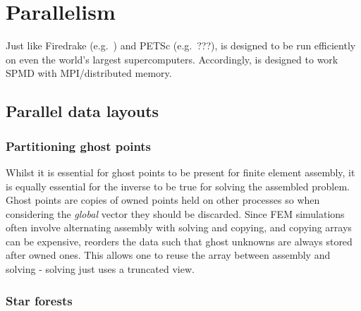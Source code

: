 \documentclass[thesis]{subfiles}
\begin{document}
\chapter{Parallelism}
\label{chapter:parallel}

Just like Firedrake (e.g.~\cite{betteridgeCodeGenerationProductive2021}) and PETSc (e.g.~???),  is designed to be run efficiently on even the world's largest supercomputers.
Accordingly,  is designed to work SPMD with MPI/distributed memory.

\section{Parallel data layouts}


\subsection{Partitioning ghost points}

Whilst it is essential for ghost points to be present for finite element assembly, it is equally essential for the inverse to be true for solving the assembled problem.
Ghost points are copies of owned points held on other processes so when considering the \textit{global} vector they should be discarded.
Since FEM simulations often involve alternating assembly with solving and copying, and copying arrays can be expensive,  reorders the data such that ghost unknowns are always stored after owned ones.
This allows one to reuse the array between assembly and solving - solving just uses a truncated view.





\subsection{Star forests}
\end{document}
